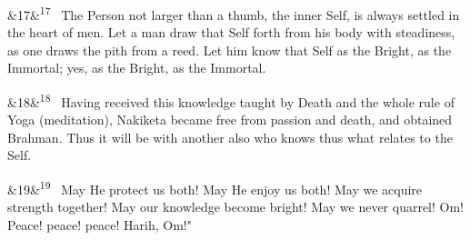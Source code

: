 \documentclass[12pt]{article}
\newcommand{\para}[1][]{\par\noindent\ifx&#1&\else\textsuperscript{\footnotesize #1}~\fi}
\begin{document}
\para[17] The Person not larger than a thumb, the inner Self, is always settled in the heart of men. Let a man draw that Self forth from his body with steadiness, as one draws the pith from a reed. Let him know that Self as the Bright, as the Immortal; yes, as the Bright, as the Immortal.

\para[18] Having received this knowledge taught by Death and the whole rule of Yoga (meditation), Nakiketa became free from passion and death, and obtained Brahman. Thus it will be with another also who knows thus what relates to the Self.

\para[19] May He protect us both! May He enjoy us both! May we acquire strength together! May our knowledge become bright! May we never quarrel! Om! Peace! peace! peace! Harih, Om!"
\end{document}
